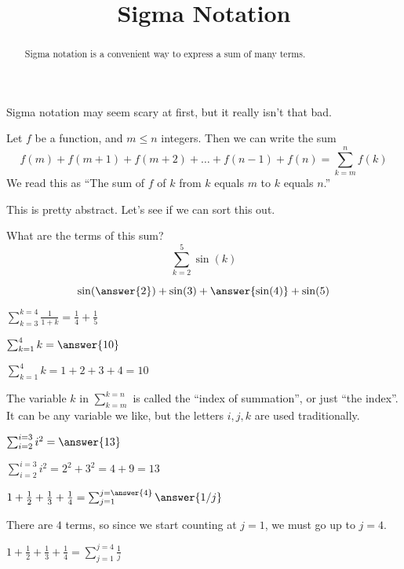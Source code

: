 \documentclass{ximera}
\title[Dig-In:]{Sigma Notation}
\begin{document}
\begin{abstract}
  Sigma notation is a convenient way to express a sum of many terms.
\end{abstract}


Sigma notation may seem scary at first, but it really isn't that bad.

\begin{definition}
  Let $f$ be a function, and $m \leq n$ integers.  Then we can write
  the sum
  \[
  f(m)+f(m+1)+f(m+2)+\dots+f(n-1)+f(n) = \sum_{k=m}^{n} f(k)
  \] 
  We read this as ``The sum of $f$ of $k$ from $k$ equals $m$ to
  $k$ equals $n$.''
\end{definition}

This is pretty abstract. Let's see if we can sort this out.


\begin{question}
What are the terms of this sum?
  \[
  \sum_{k=2}^{5} \sin(k)
  \]
  \begin{prompt}
    \[
    \sin(\answer{2}) + \sin(3) + \answer{\sin(4)} + \sin(5)
    \]
  \end{prompt}
\end{question}

\begin{example}
$\sum_{k=3}^{k=4} \frac{1}{1+k} = \frac{1}{4}+\frac{1}{5}$
\end{example}

\begin{question}
	$\sum_{k=1}^{4} k  = \answer{10}$
	\begin{hint}
		$\sum_{k=1}^{4} k  = 1+2+3+4=10$
	\end{hint}
\end{question}

The variable $k$ in $\sum_{k=m}^{k=n}$ is called the ``index of summation'', or just ``the index''.  It can be any variable we like, but the letters $i,j,k$ are used traditionally.

\begin{question}
$\sum_{i=2}^{i=3} i^2  = \answer{13}$
\begin{hint}
	$\sum_{i=2}^{i=3} i^2  = 2^2+3^2 = 4+9=13$
\end{hint}
\end{question}

\begin{question}
	$1+\frac{1}{2} + \frac{1}{3} + \frac{1}{4} = \sum_{j=1}^{j= \answer{4}} \answer{1/j}$
	\begin{hint}
		There are $4$ terms, so since we start counting at $j=1$, we must go up to $j=4$.
	\end{hint}
	\begin{hint}
		$1+\frac{1}{2} + \frac{1}{3} + \frac{1}{4} = \sum_{j=1}^{j= 4} \frac{1}{j}$
	\end{hint}
\end{question}
\end{document}
